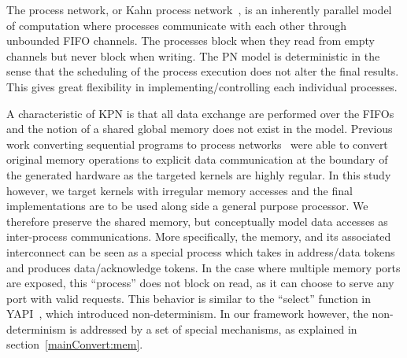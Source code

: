 \documentclass{sig-alternate}
\begin{document}
The process network, or Kahn process network~\cite{gilles1974semantics}, is an inherently parallel model of computation where processes communicate with
each other through unbounded FIFO channels.
The processes block when they read from empty channels but never block when writing.
The PN model is deterministic in the sense that the scheduling of
the process execution does not alter the final results. This gives great flexibility
in implementing/controlling each individual processes. 


A characteristic
of KPN is that all data exchange are performed over the FIFOs and the notion of
a shared global memory does not exist in the model. Previous work
converting sequential programs to process networks~\cite{mat2pn}\cite{c2stream}
were able to convert original memory operations to explicit data communication
at the boundary of the generated hardware as the targeted kernels are highly 
regular. In this study however, we target kernels with irregular memory accesses and the final implementations are to be used along side a general purpose processor. We therefore preserve the shared memory, but conceptually model data accesses as inter-process communications.
More specifically, the memory, and its associated interconnect can be seen as a special process which takes in address/data tokens and produces data/acknowledge tokens. In the case where multiple memory ports are exposed, this ``process'' does not block on read, as it can choose to serve any port with valid
requests. This behavior is similar to the ``select'' function in YAPI~\cite{Kock00yapi:application}, which introduced non-determinism. In our framework however, the non-determinism is addressed by a set of special mechanisms, as explained in section~\ref{mainConvert:mem}.
\end{document}

